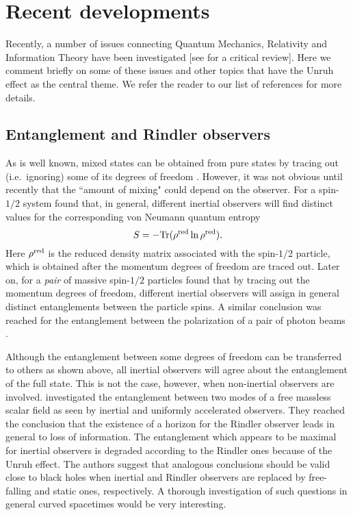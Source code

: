 \documentclass[12pt,nofootinbib,floatfix,aps,prd,showpacs,amsmath,amssymb,eqsecnum]{revtex4-2}
\begin{document}
\section{Recent developments}
\label{section:Recentdevelopments}

Recently, a number of issues connecting Quantum Mechanics,
Relativity and Information Theory have been investigated
[see \textcite{Peresetal04} for a critical review]. Here we 
comment briefly on some of these issues and other topics
that have the Unruh effect as the central theme. 
We refer the reader to our list of references for more details.

\subsection{Entanglement and Rindler observers }
\label{subsection:Entanglement}

As is well known, mixed states can be obtained from pure
states by tracing out (i.e.~ignoring) some of its degrees 
of freedom \cite{Zurek91}. However, it 
was not obvious until recently that the ``amount of mixing" 
could depend on the observer. For a spin-$1/2$ system
\textcite{Peresetal02} found that, in general, different 
inertial observers will find distinct values for the 
corresponding von Neumann quantum entropy 
$$
S= - {\rm Tr} (\rho^{\rm red} \ln \rho^{\rm red} ).
$$ 
Here $\rho^{\rm red}$ is the reduced density 
matrix associated with the spin-$1/2$ particle, which is 
obtained after the momentum degrees of freedom 
are traced out. 
Later on, for a {\em pair} of massive spin-$1/2$ 
particles \textcite{Gingrichetal02} found that by 
tracing out the momentum degrees of freedom, different inertial 
observers will assign in general distinct entanglements 
between the particle spins. A similar conclusion was reached
for the entanglement between the polarization of a pair 
of photon beams \cite{Gingrichetal03}. 

Although the entanglement between some degrees of freedom 
can be transferred to others as shown above, all inertial
observers will agree about the entanglement of the full state.
This is not the case, however, when non-inertial observers
are involved. \textcite{Fuentes-Schulleretal05} investigated 
the entanglement between two modes of a free massless scalar
field as seen by inertial and uniformly accelerated observers.
They reached the conclusion that the existence of a horizon for 
the Rindler observer leads in general to loss of information. 
The entanglement which appears to be maximal for inertial 
observers is degraded according to the Rindler ones because of 
the Unruh effect. The authors suggest that analogous conclusions 
should be valid close to black holes when inertial and Rindler 
observers are replaced by free-falling and static ones, 
respectively. A thorough investigation of such questions in 
general curved spacetimes would be very interesting.
\end{document}

